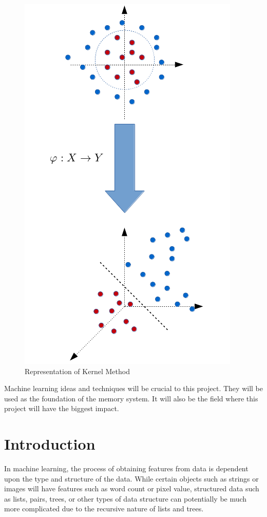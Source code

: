 \documentclass{sig-alternate}
\begin{document}
\begin{figure}[h]
	\begin{center}
		\includegraphics[width=0.75\linewidth]{kernelmeth}
	\end{center}
	\vspace{-12pt}
	\caption{Representation of Kernel Method}
	\label{fig:kernelmeth}
\end{figure}

Machine learning ideas and techniques will be crucial to this project. 
They will be used as the foundation of the memory system. It will also be the field where this 
project will have the biggest impact.

\section{Introduction}
\label{sec:intro}

In machine learning, the process of obtaining features from data is dependent upon
the type and structure of the data. While certain objects such as strings or images
will have features such as word count or pixel value, structured data such as lists, pairs, 
trees, or other types of data structure can potentially be much more complicated due to the
recursive nature of lists and trees.
\end{document}
